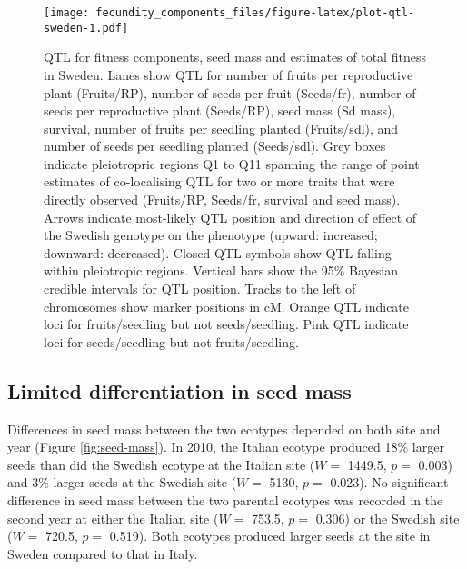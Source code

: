 \documentclass[
]{article}
\begin{document}
\begin{figure}
\centering
\texttt{[image: fecundity\_components\_files/figure-latex/plot-qtl-sweden-1.pdf]}
\caption{\label{fig:plot-qtl-sweden}QTL for fitness components, seed mass and estimates of total fitness in Sweden. Lanes show QTL for number of fruits per reproductive plant (Fruits/RP), number of seeds per fruit (Seeds/fr), number of seeds per reproductive plant (Seeds/RP), seed mass (Sd mass), survival, number of fruits per seedling planted (Fruits/sdl), and number of seeds per seedling planted (Seeds/sdl). Grey boxes indicate pleiotropric regions Q1 to Q11 spanning the range of point estimates of co-localising QTL for two or more traits that were directly observed (Fruits/RP, Seeds/fr, survival and seed mass). Arrows indicate most-likely QTL position and direction of effect of the Swedish genotype on the phenotype (upward: increased; downward: decreased). Closed QTL symbols show QTL falling within pleiotropic regions. Vertical bars show the 95\% Bayesian credible intervals for QTL position. Tracks to the left of chromosomes show marker positions in cM. Orange QTL indicate loci for fruits/seedling but not seeds/seedling. Pink QTL indicate loci for seeds/seedling but not fruits/seedling.}
\end{figure}

\hypertarget{limited-differentiation-in-seed-mass}{%
\subsection{Limited differentiation in seed mass}\label{limited-differentiation-in-seed-mass}}

Differences in seed mass between the two ecotypes depended on both site and year (Figure \ref{fig:seed-mass}). In 2010, the Italian ecotype produced 18\% larger seeds than did the Swedish ecotype at the Italian site
(\(W=\) 1449.5,
\(p=\) 0.003)
and 3\% larger seeds at the Swedish site
(\(W =\) 5130,
\(p=\) 0.023).
No significant difference in seed mass between the two parental ecotypes was recorded in the second year at either the Italian site
(\(W =\) 753.5,
\(p=\) 0.306)
or the Swedish site
(\(W=\) 720.5,
\(p=\) 0.519).
Both ecotypes produced larger seeds at the site in Sweden compared to that in Italy.
\end{document}
